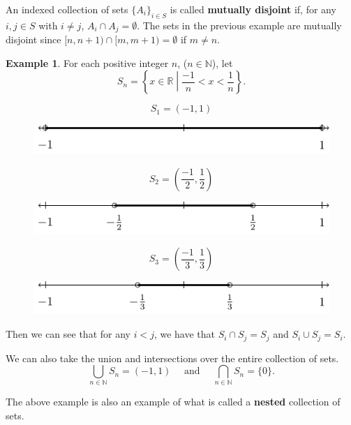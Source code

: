 \documentclass[
]{book}
\theoremstyle{definition}
\theoremstyle{definition}
\newtheorem{example}{Example}[chapter]
\theoremstyle{definition}
\theoremstyle{definition}
\theoremstyle{remark}
\begin{document}
An indexed collection of sets \(\{A_i\}_{i\in S}\) is called \textbf{mutually disjoint} if, for any \(i,j\in S\) with \(i\neq j\), \(A_i \cap A_j = \emptyset\). The sets in the previous example are mutually disjoint since \([n,n+1) \cap [m,m+1) = \emptyset\) if \(m\neq n\).

\begin{example}
For each positive integer \(n\), (\(n\in \mathbb{N}\)), let \[S_n= \left\{x\in \mathbb{R}\middle \vert \frac{-1}{n} < x < \frac{1}{n} \right\}.\]

\[S_1=(-1,1)\]

\begin{figure}

{\centering \includegraphics[width=0.35\linewidth]{tikz/Nested_s1} 

}

\end{figure}

\[S_2=(\frac{-1}{2}, \frac{1}{2})\]

\begin{figure}

{\centering \includegraphics[width=0.35\linewidth]{tikz/Nested_s2} 

}

\end{figure}

\[S_3=(\frac{-1}{3}, \frac{1}{3})\]

\begin{figure}

{\centering \includegraphics[width=0.35\linewidth]{tikz/Nested_s3} 

}

\end{figure}

Then we can see that for any \(i<j\), we have that \(S_i\cap S_j = S_j\) and \(S_i \cup S_j = S_i\).

We can also take the union and intersections over the entire collection of sets.
\[\bigcup_{n\in \mathbb{N}} S_n = (-1,1) \quad \mbox{ and } \quad \bigcap_{n\in \mathbb{N}} S_n = \{0\}.\]
\end{example}

The above example is also an example of what is called a \textbf{nested} collection of sets.
\end{document}
